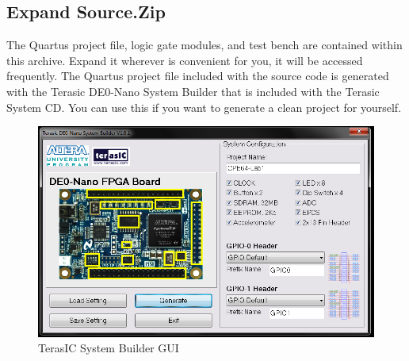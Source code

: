 \documentclass[12pt,journal]{IEEEtran}
\begin{document}
    \subsection{Expand Source.Zip}
    The Quartus project file, logic gate modules, and test bench are contained within this archive. 
    Expand it wherever is convenient for you, it will be accessed frequently. The Quartus project file
    included with the source code is generated with the Terasic DE0-Nano System Builder that is included
    with the Terasic System CD. You can use this if you want to generate a clean project for yourself.
    \begin{figure}[H]
      \includegraphics[width=.48\textwidth]{Images/screenshot_88.jpg}
      \caption{TerasIC System Builder GUI}
    \end{figure}
    
\end{document}
